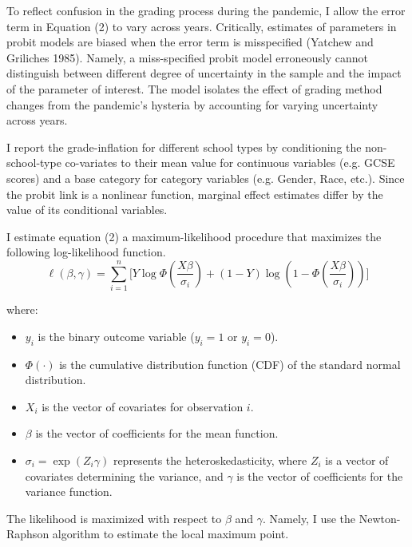To reflect confusion in the grading process during the pandemic, I allow the error term in Equation (2) to vary across years. Critically, estimates of parameters in probit models are biased when the error term is misspecified (Yatchew and Griliches 1985). Namely, a miss-specified probit model erroneously cannot distinguish between different degree of uncertainty in the sample and the impact of the parameter of interest. The model isolates the effect of grading method changes from the pandemic's hysteria by accounting for varying uncertainty across years.

I report the grade-inflation for different school types by conditioning the non-school-type co-variates to their mean value for continuous variables (e.g. GCSE scores) and a base category for category variables (e.g. Gender, Race, etc.). Since the probit link is a nonlinear function, marginal effect estimates differ by the value of its conditional variables. 

I estimate equation (2) a maximum-likelihood procedure that maximizes the following log-likelihood function.
\[
\ell(\beta, \gamma) = \sum_{i=1}^n \Bigg[ Y \log \Phi\left( \frac{X\beta}{\sigma_i} \right) + (1 - Y) \log \left( 1 - \Phi\left( \frac{X\beta}{\sigma_i} \right) \right) \Bigg]
\]

where:
\begin{itemize}
    \item \( y_i \) is the binary outcome variable (\( y_i = 1 \) or \( y_i = 0 \)).
    \item \( \Phi(\cdot) \) is the cumulative distribution function (CDF) of the standard normal distribution.
    \item \( X_i \) is the vector of covariates for observation \( i \).
    \item \( \beta \) is the vector of coefficients for the mean function.
    \item \( \sigma_i = \exp(Z_i\gamma) \) represents the heteroskedasticity, where \( Z_i \) is a vector of covariates determining the variance, and \( \gamma \) is the vector of coefficients for the variance function.
\end{itemize}

The likelihood is maximized with respect to \( \beta \) and \( \gamma \). Namely, I use the Newton-Raphson algorithm to estimate the local maximum point.